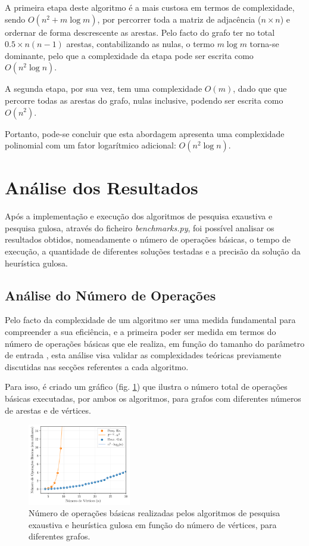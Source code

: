 \documentclass[mirror, portugues]{revdetua}
\begin{document}
A primeira etapa deste algoritmo é a mais custosa em termos de complexidade, sendo $O(n^2 + m \log m)$, por percorrer toda a matriz de adjacência ($n \times n$) e ordernar de forma descrescente as arestas. Pelo facto do grafo ter no total $0.5 \times n(n-1)$ arestas, contabilizando as nulas, o termo $m \log m$ torna-se dominante, pelo que a complexidade da etapa pode ser escrita como $O(n^2 \log n)$.

A segunda etapa, por sua vez, tem uma complexidade $O(m)$, dado que que percorre todas as arestas do grafo, nulas inclusive, podendo ser escrita como $O(n^2)$.

Portanto, pode-se concluir que esta abordagem apresenta uma complexidade polinomial com um fator logarítmico adicional: $O(n^2 \log n)$.

\section{Análise dos Resultados}

Após a implementação e execução dos algoritmos de pesquisa exaustiva e pesquisa gulosa, através do ficheiro \textit{benchmarks.py}, foi possível analisar os resultados obtidos, nomeadamente o número de operações básicas, o tempo de execução, a quantidade de diferentes soluções testadas e a precisão da solução da heurística gulosa.

\subsection{Análise do Número de Operações}

Pelo facto da complexidade de um algoritmo ser uma medida fundamental para compreender a sua eficiência, e a primeira poder ser medida em termos do número de operações básicas que ele realiza, em função do tamanho do parâmetro de entrada \cite{BS22}, esta análise visa validar as complexidades teóricas previamente discutidas nas secções referentes a cada algoritmo.

Para isso, é criado um gráfico (fig. \ref{fig:numeroops}) que ilustra o número total de operações básicas executadas, por ambos os algoritmos, para grafos com diferentes números de arestas e de vértices.

\begin{figure}[h]
    \centering
    \includegraphics[width=0.4\textwidth]{../assets/numberOPS.png}
    \caption{Número de operações básicas realizadas pelos algoritmos de pesquisa exaustiva e heurística gulosa em função do número de vértices, para diferentes grafos.}
    \label{fig:numeroops}
\end{figure}
\end{document}
